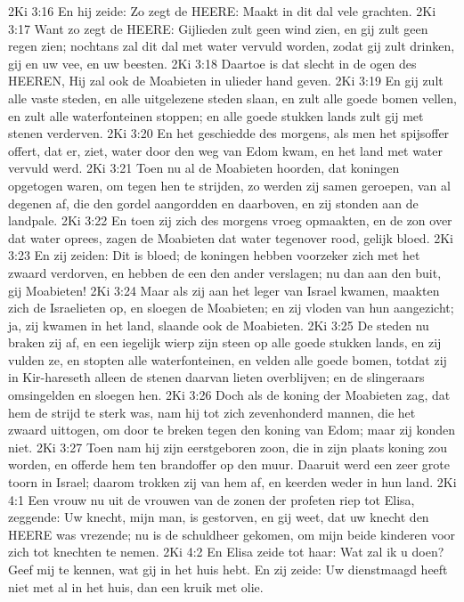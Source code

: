2Ki 3:16  En hij zeide: Zo zegt de HEERE: Maakt in dit dal vele grachten.
2Ki 3:17  Want zo zegt de HEERE: Gijlieden zult geen wind zien, en gij zult geen regen zien; nochtans zal dit dal met water vervuld worden, zodat gij zult drinken, gij en uw vee, en uw beesten.
2Ki 3:18  Daartoe is dat slecht in de ogen des HEEREN, Hij zal ook de Moabieten in ulieder hand geven.
2Ki 3:19  En gij zult alle vaste steden, en alle uitgelezene steden slaan, en zult alle goede bomen vellen, en zult alle waterfonteinen stoppen; en alle goede stukken lands zult gij met stenen verderven.
2Ki 3:20  En het geschiedde des morgens, als men het spijsoffer offert, dat er, ziet, water door den weg van Edom kwam, en het land met water vervuld werd.
2Ki 3:21  Toen nu al de Moabieten hoorden, dat koningen opgetogen waren, om tegen hen te strijden, zo werden zij samen geroepen, van al degenen af, die den gordel aangordden en daarboven, en zij stonden aan de landpale.
2Ki 3:22  En toen zij zich des morgens vroeg opmaakten, en de zon over dat water oprees, zagen de Moabieten dat water tegenover rood, gelijk bloed.
2Ki 3:23  En zij zeiden: Dit is bloed; de koningen hebben voorzeker zich met het zwaard verdorven, en hebben de een den ander verslagen; nu dan aan den buit, gij Moabieten!
2Ki 3:24  Maar als zij aan het leger van Israel kwamen, maakten zich de Israelieten op, en sloegen de Moabieten; en zij vloden van hun aangezicht; ja, zij kwamen in het land, slaande ook de Moabieten.
2Ki 3:25  De steden nu braken zij af, en een iegelijk wierp zijn steen op alle goede stukken lands, en zij vulden ze, en stopten alle waterfonteinen, en velden alle goede bomen, totdat zij in Kir-hareseth alleen de stenen daarvan lieten overblijven; en de slingeraars omsingelden en sloegen hen.
2Ki 3:26  Doch als de koning der Moabieten zag, dat hem de strijd te sterk was, nam hij tot zich zevenhonderd mannen, die het zwaard uittogen, om door te breken tegen den koning van Edom; maar zij konden niet.
2Ki 3:27  Toen nam hij zijn eerstgeboren zoon, die in zijn plaats koning zou worden, en offerde hem ten brandoffer op den muur. Daaruit werd een zeer grote toorn in Israel; daarom trokken zij van hem af, en keerden weder in hun land.
2Ki 4:1  Een vrouw nu uit de vrouwen van de zonen der profeten riep tot Elisa, zeggende: Uw knecht, mijn man, is gestorven, en gij weet, dat uw knecht den HEERE was vrezende; nu is de schuldheer gekomen, om mijn beide kinderen voor zich tot knechten te nemen.
2Ki 4:2  En Elisa zeide tot haar: Wat zal ik u doen? Geef mij te kennen, wat gij in het huis hebt. En zij zeide: Uw dienstmaagd heeft niet met al in het huis, dan een kruik met olie.
